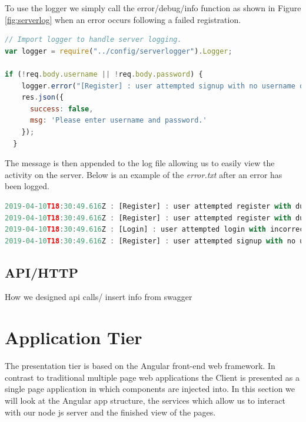 To use the logger we simply call the error/debug/info function as shown in Figure \ref{fig:serverlog} when an error occurs following a failed registration.

\begin{lstlisting}[language=JAVASCRIPT,caption={Server Log call from API},captionpos=b,label={fig:serverlog}]
// Import logger to handle server logging. 
var logger = require("../config/serverlogger").Logger;

if (!req.body.username || !req.body.password) {
    logger.error("[Register] : user attempted signup with no username or password");
    res.json({
      success: false,
      msg: 'Please enter username and password.'
    });
  }
\end{lstlisting}

The message is then appended to the log file allowing us to easily view the activity on the server. Below is an example of the \textit{error.txt} after an error has been logged.

\begin{lstlisting}[language=JAVASCRIPT,caption={error.txt log file},captionpos=b,label={fig:errorlog}]
2019-04-10T18:30:49.616Z : [Register] : user attempted register with duplicate username
2019-04-10T18:30:49.616Z : [Register] : user attempted register with duplicate email
2019-04-10T18:30:49.616Z : [Login] : user attempted login with incorrect password
2019-04-10T18:30:49.616Z : [Register] : user attempted signup with no username or password
\end{lstlisting}

\subsection{API/HTTP}
How we designed api calls/
insert info from swagger

\section{Application Tier}
The presentation tier is based on the Angular front-end web framework. In contrast to traditional multiple page web applications the Client is presented as a single page application in which components are injected into. In this section we will look at the Angular app structure, the services which allow us to interact with our node js server and the finished view of the pages.

